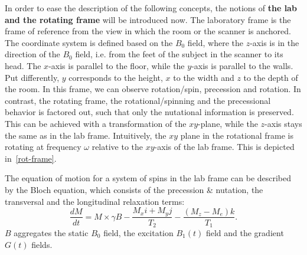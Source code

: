 \begin{table}[h]
 \noindent{}
 \caption{Longitudinal relaxation $T_1$ and transversal relaxation $T_2$ times for typical tissue types at 1.5 T main magnetic field strength ~\autocite{plewes_physics_2012}.}
 \label{t1t2-vals}
\end{table}

In order to ease the description of the following concepts, the notions of \textbf{the lab and the rotating frame} will be introduced now.
The laboratory frame is the frame of reference from the view in which the room or the scanner is anchored.
The coordinate system is defined based on the $B_0$ field, where the $z$-axis is in the direction of the $B_0$ field, i.e. from the feet of the subject in the scanner to its head.
The $x$-axis is parallel to the floor, while the $y$-axis is parallel to the walls.
Put differently, $y$ corresponds to the height, $x$ to the width and $z$ to the depth of the room.
In this frame, we can observe rotation/spin, precession and rotation.
In contrast, the rotating frame, the rotational/spinning and the precessional behavior is factored out, such that only the nutational information is preserved.
This can be achieved with a transformation of the $xy$-plane, while the $z$-axis stays the same as in the lab frame.
Intuitively, the $xy$ plane in the rotational frame is rotating at frequency $\omega$ relative to the $xy$-axis of the lab frame.
This is depicted in~\ref{rot-frame}.


The equation of motion for a system of spins in the lab frame can be described by the Bloch equation, which consists of the precession \& nutation, the transversal and the longitudinal relaxation terms:
\[ \frac{dM}{dt} = M \times \gamma B - \frac{M_x i + M_y j}{T_2} - \frac{(M_z - M_e) k }{T_1}. \]
$B$ aggregates the static $B_0$ field, the excitation $B_1(t)$ field and the gradient $G(t)$ fields.

